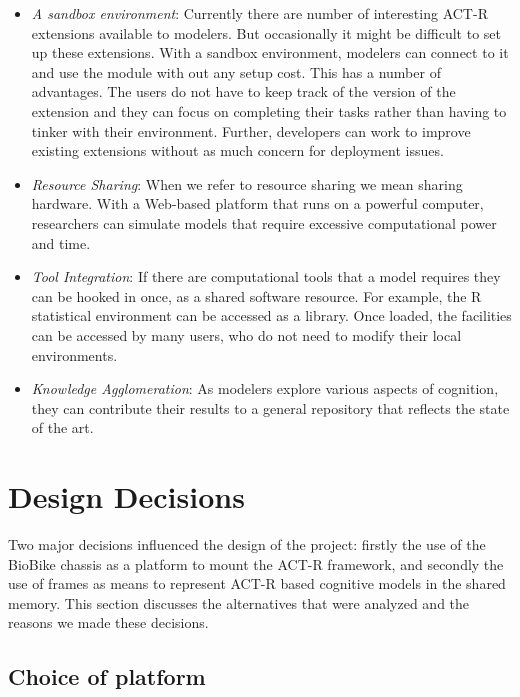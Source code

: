 \begin{itemize}
\item \emph{A sandbox environment}: Currently there are number of
  interesting ACT-R extensions available to modelers. But occasionally
  it might be difficult to set up these extensions.  With a sandbox
  environment, modelers can connect to it and use the module with out
  any setup cost. This has a number of advantages.  The users do not
  have to keep track of the version of the extension and they can
  focus on completing their tasks rather than having to tinker with
  their environment.  Further, developers can work to improve existing
  extensions without as much concern for deployment issues.

\item \emph{Resource Sharing}: When we refer to resource sharing we
  mean sharing hardware. With a Web-based platform that runs on a
  powerful computer, researchers can simulate models that require
  excessive computational power and time.

\item \emph{Tool Integration}: If there are computational tools that a
  model requires they can be hooked in once, as a shared software
  resource.  For example, the R statistical environment can be
  accessed as a library.  Once loaded, the facilities can be accessed
  by many users, who do not need to modify their local environments.

\item \emph{Knowledge Agglomeration}: As modelers explore various
  aspects of cognition, they can contribute their results to a general
  repository that reflects the state of the art.
\end{itemize}

\section{Design Decisions}
Two major decisions influenced the design of the project: firstly the
use of the BioBike chassis as a platform to mount the ACT-R framework,
and secondly the use of frames as means to represent ACT-R based
cognitive models in the shared memory. This section discusses the
alternatives that were analyzed and the reasons we made these
decisions.

\subsection{Choice of platform}


